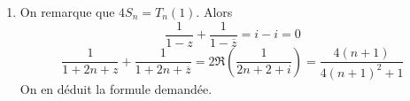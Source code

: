 \begin{enumerate}
 \item On remarque que $4S_n = T_n(1)$. Alors
\begin{displaymath}
 \frac{1}{1-z} + \frac{1}{1-\overline{z}}
 = i-i = 0
\end{displaymath}
\begin{displaymath}
 \frac{1}{1+2n+z} + \frac{1}{1+2n+\overline{z}}
 = 2\Re\left( \frac{1}{2n+2+i}\right) 
 = \frac{4(n+1)}{4(n+1)^2 + 1}
\end{displaymath}
On en déduit la formule demandée.
\end{enumerate}

